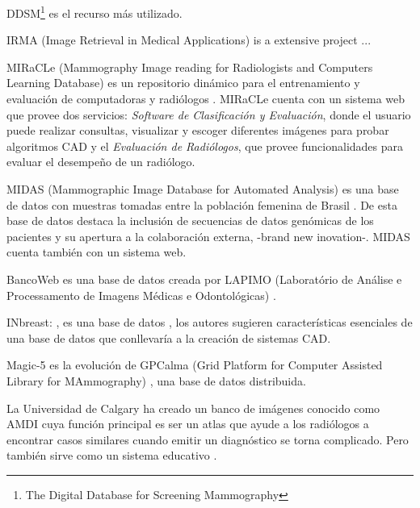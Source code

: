 DDSM\footnote{The Digital Database for Screening Mammography}
\cite{heath2000digital} es el recurso más utilizado. 

IRMA (Image Retrieval in Medical Applications) is a extensive project
\cite{doi:10.1117/12.770325} ...

MIRaCLe (Mammography Image reading for Radiologists and Computers Learning
Database) es un repositorio dinámico para el entrenamiento y evaluación de
computadoras y radiólogos \cite{antoniou2009web}. MIRaCLe cuenta con un sistema
web que provee dos servicios: \textit{Software de Clasificación y Evaluación},
donde el usuario puede realizar consultas, visualizar y escoger diferentes
imágenes para probar algoritmos CAD y el \textit{Evaluación de Radiólogos}, que
provee funcionalidades para evaluar el desempeño de un radiólogo.

MIDAS (Mammographic Image Database for Automated Analysis) es una base de datos
con muestras tomadas entre la población femenina de Brasil
\cite{fernandes2012midas}. De esta base de datos destaca la inclusión de
secuencias de datos genómicas de los pacientes y su apertura a la colaboración
externa, -brand new inovation-. MIDAS cuenta también con un sistema web.

BancoWeb es una base de datos creada por LAPIMO (Laboratório de Análise e
Processamento de Imagens Médicas e Odontológicas) \cite{matheus2011online}.

INbreast: \cite{moreira2012inbreast}, es una base de datos , los autores
sugieren características esenciales de una base de datos que conllevaría a la
creación de sistemas CAD.

Magic-5 \cite{bellotti2004magic} es la evolución de GPCalma (Grid Platform for
Computer Assisted Library for MAmmography) \cite{lauria2006gpcalma}, una base
de datos distribuida. 

La Universidad de Calgary ha creado un banco de imágenes conocido como AMDI
\cite{suri2006recent} cuya función principal es ser un atlas que ayude a los
radiólogos a encontrar casos similares cuando emitir un diagnóstico se torna
complicado. Pero también sirve como un sistema educativo
\cite{guliato2009indiam}.


